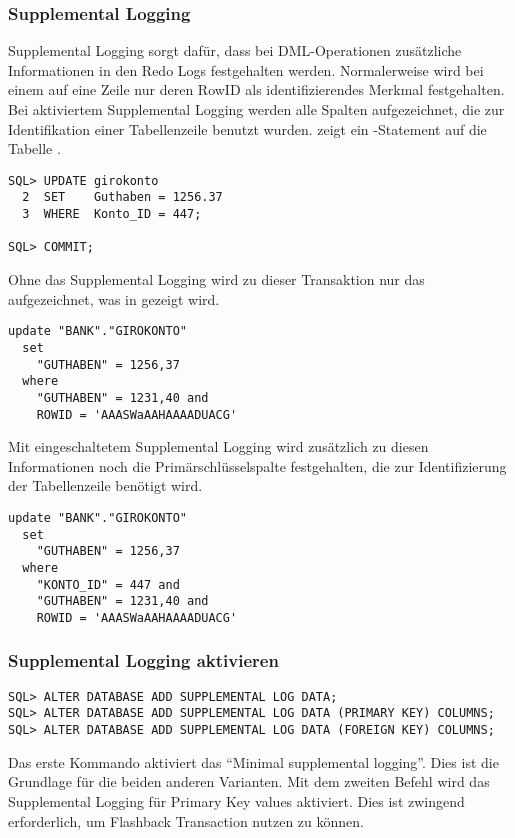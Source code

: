         \subsubsection{Supplemental Logging}
          Supplemental Logging sorgt dafür, dass bei DML-Operationen zusätzliche Informationen in den Redo Logs festgehalten werden. Normalerweise wird bei einem  auf eine Zeile nur deren RowID als identifizierendes Merkmal festgehalten. Bei aktiviertem Supplemental Logging werden alle Spalten aufgezeichnet, die zur Identifikation einer Tabellenzeile benutzt wurden.  zeigt ein -Statement auf die Tabelle .
          \begin{lstlisting}[caption={Supplemental Logging - Demo Schritt 1},label=admin1703,language=oracle_sql]
SQL> UPDATE girokonto
  2  SET    Guthaben = 1256.37
  3  WHERE  Konto_ID = 447;

SQL> COMMIT;
          \end{lstlisting}
          Ohne das Supplemental Logging wird zu dieser Transaktion nur das aufgezeichnet, was in  gezeigt wird.
          \begin{lstlisting}[caption={Supplemental Logging - Demo Schritt 2 },label=admin1704,language=oracle_sql]
update "BANK"."GIROKONTO"
  set
    "GUTHABEN" = 1256,37
  where
    "GUTHABEN" = 1231,40 and
    ROWID = 'AAASWaAAHAAAADUACG'
          \end{lstlisting}
          Mit eingeschaltetem Supplemental Logging wird zusätzlich zu diesen Informationen noch die Primärschlüsselspalte festgehalten, die zur Identifizierung der Tabellenzeile benötigt wird.
          \begin{lstlisting}[caption={Supplemental Logging - Demo Schritt 3},label=admin1705,language=oracle_sql]
update "BANK"."GIROKONTO"
  set
    "GUTHABEN" = 1256,37
  where
    "KONTO_ID" = 447 and
    "GUTHABEN" = 1231,40 and
    ROWID = 'AAASWaAAHAAAADUACG'
          \end{lstlisting}
        \subsubsection{Supplemental Logging aktivieren}
          \begin{lstlisting}[caption={Supplemental Logging},label=admin1706,language=oracle_sql]
SQL> ALTER DATABASE ADD SUPPLEMENTAL LOG DATA;
SQL> ALTER DATABASE ADD SUPPLEMENTAL LOG DATA (PRIMARY KEY) COLUMNS;
SQL> ALTER DATABASE ADD SUPPLEMENTAL LOG DATA (FOREIGN KEY) COLUMNS;
          \end{lstlisting}
          Das erste Kommando aktiviert das \enquote{Minimal supplemental logging}. Dies ist die Grundlage für die beiden anderen Varianten. Mit dem zweiten Befehl wird das Supplemental Logging für Primary Key values aktiviert. Dies ist zwingend erforderlich, um Flashback Transaction nutzen zu können.

